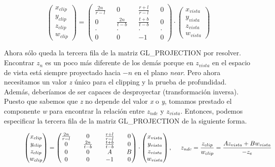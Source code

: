 \begin{figure}[h]
  \[
  \begin{pmatrix}
    x_{clip} \\ y_{clip} \\ z_{clip} \\ w_{clip}
  \end{pmatrix}
  =
  \begin{pmatrix}
    \frac{2n}{r-l} &&              0 && \frac{r+l}{r-l} &&     0 \\
                 0 && \frac{2n}{t-b} && \frac{t+b}{t-b} &&     0 \\
             \cdot &&          \cdot &&           \cdot && \cdot \\
                 0 &&              0 &&              -1 &&     0
  \end{pmatrix}
  \cdot
  \begin{pmatrix}
    x_{vista} \\ y_{vista} \\ z_{vista} \\ w_{vista}
  \end{pmatrix}
  \]
\end{figure}


\newpage 
Ahora sólo queda la tercera fila de la matriz GL\_PROJECTION por resolver. Encontrar $z_n$ es un poco más diferente de los demás porque en $z_{vista}$ en el espacio de vista está siempre proyectado hacia $-n$ en el plano \textit{near}. Pero ahora necesitamos un valor \textit{z} único para el clipping y la prueba de profundidad. Además, deberíamos de ser capaces de desproyectar (transformación inversa). Puesto que sabemos que \textit{z} no depende del valor \textit{x} o \textit{y}, tomamos prestado el componente \textit{w} para encontrar la relación entre $z_{ndc}$ y $z_{vista}$. Entonces, podemos especificar la tercera fila de la matriz GL\_PROJECTION de la siguiente forma.

\begin{figure}[h]
  \[
  \begin{pmatrix}
    x_{clip} \\ y_{clip} \\ z_{clip} \\ w_{clip}
  \end{pmatrix}
  =
  \begin{pmatrix}
    \frac{2n}{r-l} &&              0 && \frac{r+l}{r-l} &&     0 \\
                 0 && \frac{2n}{t-b} && \frac{t+b}{t-b} &&     0 \\
                 0 &&              0 &&               A &&     B \\
                 0 &&              0 &&              -1 &&     0
  \end{pmatrix}
  \cdot
  \begin{pmatrix}
    x_{vista} \\ y_{vista} \\ z_{vista} \\ w_{vista}
  \end{pmatrix}
  ,\hspace*{0.5cm} z_{ndc} = \frac{z_{clip}}{w_{clip}} = \frac{Az_{vista} + Bw_{vista}}{-z_e}
  \]
\end{figure}

